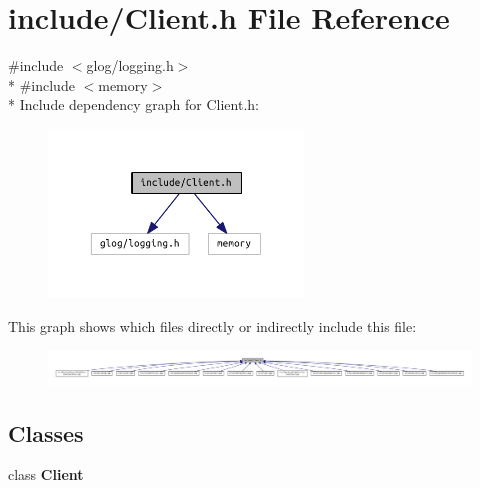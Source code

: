 \section{include/\+Client.h File Reference}
\label{_client_8h}
{\ttfamily \#include $<$glog/logging.\+h$>$}\\*
{\ttfamily \#include $<$memory$>$}\\*
Include dependency graph for Client.\+h\+:
\nopagebreak
\begin{figure}[H]
\begin{center}
\leavevmode
\includegraphics[width=192pt]{_client_8h__incl}
\end{center}
\end{figure}
This graph shows which files directly or indirectly include this file\+:
\nopagebreak
\begin{figure}[H]
\begin{center}
\leavevmode
\includegraphics[width=350pt]{_client_8h__dep__incl}
\end{center}
\end{figure}
\subsection*{Classes}
\begin{DoxyCompactItemize}
\item 
class {\bf Client}
\end{DoxyCompactItemize}
